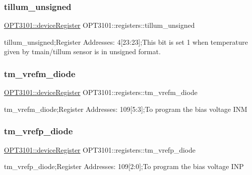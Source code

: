 \subsubsection{\texorpdfstring{tillum\+\_\+unsigned}{tillum\_unsigned}}
{\footnotesize\ttfamily \mbox{\hyperlink{class_o_p_t3101_1_1device_register}{O\+P\+T3101\+::device\+Register}} O\+P\+T3101\+::registers\+::tillum\+\_\+unsigned}



tillum\+\_\+unsigned;Register Addresses\+: 4\mbox{[}23\+:23\mbox{]};This bit is set \textquotesingle{}1\textquotesingle{} when temperature given by tmain/tillum sensor is in unsigned format. 

\mbox{\label{class_o_p_t3101_1_1registers_a5d168998fa7b8866919cc41cafde1356}} 
\subsubsection{\texorpdfstring{tm\+\_\+vrefm\+\_\+diode}{tm\_vrefm\_diode}}
{\footnotesize\ttfamily \mbox{\hyperlink{class_o_p_t3101_1_1device_register}{O\+P\+T3101\+::device\+Register}} O\+P\+T3101\+::registers\+::tm\+\_\+vrefm\+\_\+diode}



tm\+\_\+vrefm\+\_\+diode;Register Addresses\+: 109\mbox{[}5\+:3\mbox{]};To program the bias voltage I\+NM 

\mbox{\label{class_o_p_t3101_1_1registers_abe55d5504aa2cdceab7586e85926d607}} 
\subsubsection{\texorpdfstring{tm\+\_\+vrefp\+\_\+diode}{tm\_vrefp\_diode}}
{\footnotesize\ttfamily \mbox{\hyperlink{class_o_p_t3101_1_1device_register}{O\+P\+T3101\+::device\+Register}} O\+P\+T3101\+::registers\+::tm\+\_\+vrefp\+\_\+diode}



tm\+\_\+vrefp\+\_\+diode;Register Addresses\+: 109\mbox{[}2\+:0\mbox{]};To program the bias voltage I\+NP 

